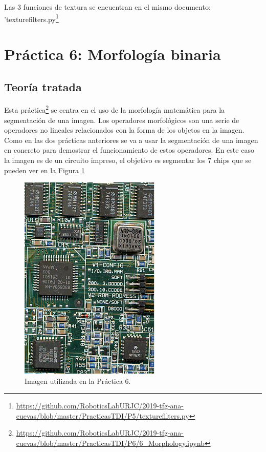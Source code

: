Las 3 funciones de textura se encuentran en el mismo documento: 'texturefilters.py\footnote{\url{https://github.com/RoboticsLabURJC/2019-tfg-ana-cuevas/blob/master/PracticasTDI/P5/texturefilters.py}}

\section{ Práctica 6: Morfología binaria}
\subsection{Teoría tratada}

Esta práctica\footnote{\url{https://github.com/RoboticsLabURJC/2019-tfg-ana-cuevas/blob/master/PracticasTDI/P6/6_Morphology.ipynb}} se centra en el uso de la morfología matemática para la segmentación de una imagen. Los operadores morfológicos son una serie de operadores no lineales relacionados con la forma de los objetos en la imagen. Como en las dos prácticas anteriores se va a usar la segmentación de una imagen en concreto para demostrar el funcionamiento de estos operadores. En este caso la imagen es de un circuito impreso, el objetivo es segmentar los 7 chips que se pueden ver en la Figura \ref{placa}\\

\begin{figure}[h]
\centering
\includegraphics[width=0.6\textwidth]{imagenes/placa}
\caption{Imagen utilizada en la Práctica 6.}
\label{placa}
\end{figure}

